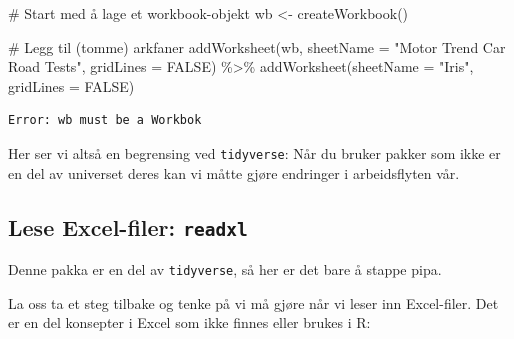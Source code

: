 \documentclass[
  letterpaper,
  DIV=11,
  numbers=noendperiod]{scrreprt}
\newenvironment{Shaded}{\begin{snugshade}}{\end{snugshade}}
\newcommand{\AttributeTok}[1]{\textcolor[rgb]{0.40,0.45,0.13}{#1}}
\newcommand{\CommentTok}[1]{\textcolor[rgb]{0.37,0.37,0.37}{#1}}
\newcommand{\ConstantTok}[1]{\textcolor[rgb]{0.56,0.35,0.01}{#1}}
\newcommand{\FunctionTok}[1]{\textcolor[rgb]{0.28,0.35,0.67}{#1}}
\newcommand{\NormalTok}[1]{\textcolor[rgb]{0.00,0.23,0.31}{#1}}
\newcommand{\OtherTok}[1]{\textcolor[rgb]{0.00,0.23,0.31}{#1}}
\newcommand{\SpecialCharTok}[1]{\textcolor[rgb]{0.37,0.37,0.37}{#1}}
\newcommand{\StringTok}[1]{\textcolor[rgb]{0.13,0.47,0.30}{#1}}
\begin{document}
\begin{Shaded}
\begin{Highlighting}[]
\CommentTok{\# Start med å lage et workbook{-}objekt}
\NormalTok{wb }\OtherTok{\textless{}{-}} \FunctionTok{createWorkbook}\NormalTok{()}

\CommentTok{\# Legg til (tomme) arkfaner}
\FunctionTok{addWorksheet}\NormalTok{(wb, }\AttributeTok{sheetName =} \StringTok{"Motor Trend Car Road Tests"}\NormalTok{, }\AttributeTok{gridLines =} \ConstantTok{FALSE}\NormalTok{) }\SpecialCharTok{\%\textgreater{}\%} 
  \FunctionTok{addWorksheet}\NormalTok{(}\AttributeTok{sheetName =} \StringTok{"Iris"}\NormalTok{, }\AttributeTok{gridLines =} \ConstantTok{FALSE}\NormalTok{)}
\end{Highlighting}
\end{Shaded}

\begin{verbatim}
Error: wb must be a Workbok
\end{verbatim}

Her ser vi altså en begrensing ved \texttt{tidyverse}: Når du bruker
pakker som ikke er en del av universet deres kan vi måtte gjøre
endringer i arbeidsflyten vår.

\hypertarget{lese-excel-filer-readxl}{%
\subsection{\texorpdfstring{Lese Excel-filer:
\texttt{readxl}}{Lese Excel-filer: readxl}}\label{lese-excel-filer-readxl}}

Denne pakka er en del av \texttt{tidyverse}, så her er det bare å stappe
pipa.

La oss ta et steg tilbake og tenke på vi må gjøre når vi leser inn
Excel-filer. Det er en del konsepter i Excel som ikke finnes eller
brukes i R:
\end{document}
